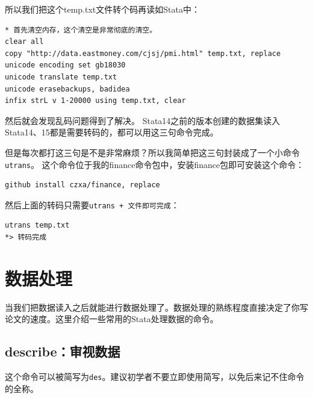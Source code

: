 \documentclass[]{ctexbook}
\begin{document}
所以我们把这个temp.txt文件转个码再读如Stata中：

\begin{lstlisting}
* 首先清空内存，这个清空是非常彻底的清空。
clear all
copy "http://data.eastmoney.com/cjsj/pmi.html" temp.txt, replace
unicode encoding set gb18030
unicode translate temp.txt
unicode erasebackups, badidea
infix strL v 1-20000 using temp.txt, clear
\end{lstlisting}

然后就会发现乱码问题得到了解决。
Stata14之前的版本创建的数据集读入Stata14、15都是需要转码的，都可以用这三句命令完成。

但是每次都打这三句是不是非常麻烦？所以我简单把这三句封装成了一个小命令\texttt{utrans}。
这个命令位于我的finance命令包中，安装finance包即可安装这个命令：

\begin{lstlisting}
github install czxa/finance, replace
\end{lstlisting}

然后上面的转码只需要\texttt{utrans\ +\ 文件即可完成}：

\begin{lstlisting}
utrans temp.txt
*> 转码完成
\end{lstlisting}

\hypertarget{section-15}{%
\section{数据处理}\label{section-15}}

当我们把数据读入之后就能进行数据处理了。数据处理的熟练程度直接决定了你写论文的速度。这里介绍一些常用的Stata处理数据的命令。

\hypertarget{describe}{%
\subsection{describe：审视数据}\label{describe}}

这个命令可以被简写为\texttt{des}。建议初学者不要立即使用简写，以免后来记不住命令的全称。
\end{document}
